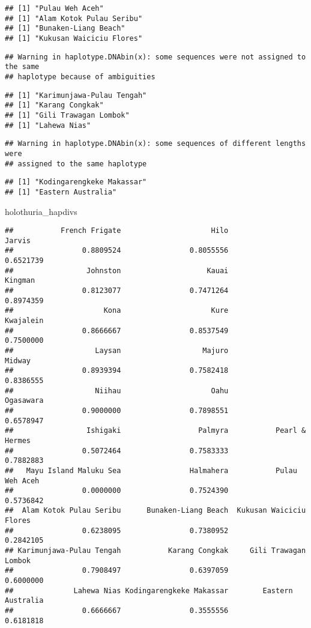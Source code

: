 \documentclass[
]{article}
\newenvironment{Shaded}{\begin{snugshade}}{\end{snugshade}}
\newcommand{\NormalTok}[1]{#1}
\begin{document}
\begin{verbatim}
## [1] "Pulau Weh Aceh"
## [1] "Alam Kotok Pulau Seribu"
## [1] "Bunaken-Liang Beach"
## [1] "Kukusan Waiciciu Flores"
\end{verbatim}

\begin{verbatim}
## Warning in haplotype.DNAbin(x): some sequences were not assigned to the same
## haplotype because of ambiguities
\end{verbatim}

\begin{verbatim}
## [1] "Karimunjawa-Pulau Tengah"
## [1] "Karang Congkak"
## [1] "Gili Trawagan Lombok"
## [1] "Lahewa Nias"
\end{verbatim}

\begin{verbatim}
## Warning in haplotype.DNAbin(x): some sequences of different lengths were
## assigned to the same haplotype
\end{verbatim}

\begin{verbatim}
## [1] "Kodingarengkeke Makassar"
## [1] "Eastern Australia"
\end{verbatim}

\begin{Shaded}
\begin{Highlighting}[]
\NormalTok{holothuria_hapdivs}
\end{Highlighting}
\end{Shaded}

\begin{verbatim}
##           French Frigate                     Hilo                   Jarvis 
##                0.8809524                0.8055556                0.6521739 
##                 Johnston                    Kauai                  Kingman 
##                0.8123077                0.7471264                0.8974359 
##                     Kona                     Kure                Kwajalein 
##                0.8666667                0.8537549                0.7500000 
##                   Laysan                   Majuro                   Midway 
##                0.8939394                0.7582418                0.8386555 
##                   Niihau                     Oahu                Ogasawara 
##                0.9000000                0.7898551                0.6578947 
##                 Ishigaki                  Palmyra           Pearl & Hermes 
##                0.5072464                0.7583333                0.7882883 
##   Mayu Island Maluku Sea                Halmahera           Pulau Weh Aceh 
##                0.0000000                0.7524390                0.5736842 
##  Alam Kotok Pulau Seribu      Bunaken-Liang Beach  Kukusan Waiciciu Flores 
##                0.6238095                0.7380952                0.2842105 
## Karimunjawa-Pulau Tengah           Karang Congkak     Gili Trawagan Lombok 
##                0.7908497                0.6397059                0.6000000 
##              Lahewa Nias Kodingarengkeke Makassar        Eastern Australia 
##                0.6666667                0.3555556                0.6181818
\end{verbatim}
\end{document}
